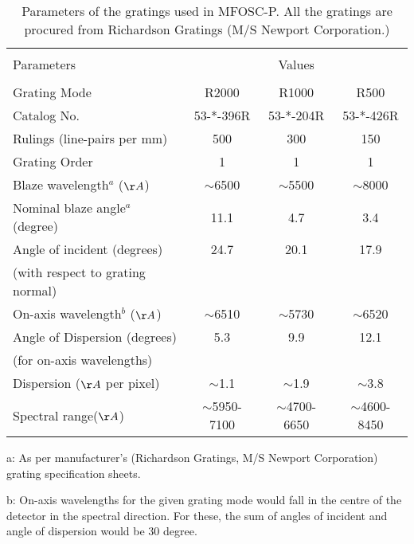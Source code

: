 \begin{table*}
	\centering
	\caption{Parameters of the gratings used in MFOSC-P. All the  
		gratings are
		procured from Richardson Gratings (M/S Newport Corporation.)}
	\begin{tabular}{lccc}
		\hline
		\hline
		&   &   &    \\
		Parameters &   &  Values & \\
		&   &   &    \\
		\hline
		\hline
		Grating Mode     &  R2000   &  R1000 & R500 \\
		\hline
		Catalog No.  &   53-*-396R & 53-*-204R & 53-*-426R \\
		Rulings (line-pairs per mm) &  500    &  300   & 150 \\
		Grating Order    &  1 & 1 & 1\\
		Blaze wavelength$^a$  ($\AA$)    & $\sim$6500   & $\sim$5500  &	$\sim$8000  \\
		Nominal blaze angle$^a$ (degree)  & 11.1 & 4.7 & 3.4 \\
		Angle of incident (degrees)  &  24.7  &  20.1 &  17.9 \\
		(with respect to grating normal)  & & &  \\
		On-axis wavelength$^{b}$ ($\AA$)   & $\sim$6510   & $\sim$5730  & $\sim$6520  \\
		Angle of Dispersion  (degrees)  &  5.3  &  9.9 &  12.1 \\
		(for on-axis wavelengths)   & & &  \\
		Dispersion ($\AA$ per pixel) & $\sim$1.1  & $\sim$1.9   &
		$\sim$3.8  \\
		Spectral range($\AA$)   & $\sim$5950-7100 & $\sim$4700-6650 &
		$\sim$4600-8450\\
		\hline
		\hline
		
	\end{tabular}
	\label{table-gratings}
	\begin{list}{}{}
		\item a: As per manufacturer's (Richardson Gratings, M/S Newport Corporation) grating specification sheets.
    	\item b: On-axis wavelengths for the given grating mode would fall in the centre of the detector in the spectral direction. For these, the sum of angles of incident and angle of dispersion would be 30 degree.
	\end{list}
\end{table*}


